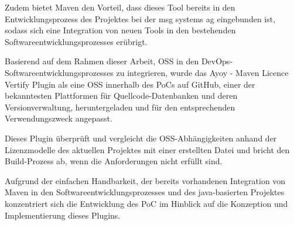 Zudem bietet Maven den Vorteil, dass dieses Tool bereits in den Entwicklungsprozess des Projektes bei der msg systems ag eingebunden ist, sodass sich eine Integration von neuen Tools in den bestehenden Softwareentwicklungsprozesses erübrigt.

Basierend auf dem Rahmen dieser Arbeit, OSS in den DevOps-Softwareentwicklungsprozesses zu integrieren, wurde das Ayoy - Maven Licence Vertify Plugin \cite{allberg_ayoyabayoy-maven-license-verifier-plugin_2021} als eine OSS innerhalb des PoCs auf GitHub, einer der bekanntesten Plattformen für Quellcode-Datenbanken und deren Versionverwaltung, heruntergeladen und für den entsprechenden Verwendungszweck angepasst.

Dieses Plugin überprüft und vergleicht die OSS-Abhängigkeiten anhand der Lizenzmodelle des aktuellen Projektes mit einer erstellten Datei und bricht den Build-Prozess ab, wenn die Anforderungen nicht erfüllt sind.

Aufgrund der einfachen Handbarkeit, der bereits vorhandenen Integration von Maven in den Softwareentwicklungsprozesses und des java-basierten Projektes konzentriert sich die Entwicklung des PoC im Hinblick auf die Konzeption und Implementierung dieses Plugins. 


